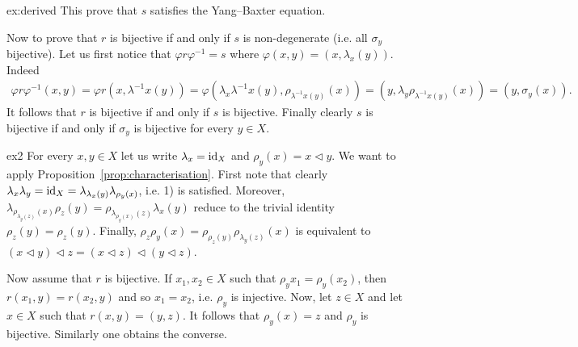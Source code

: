 \begin{sol}{ex:derived}
    This prove that $s$ satisfies the Yang--Baxter equation.

    Now to prove that $r$ is bijective if and only if $s$ is non-degenerate (i.e. all $\sigma_y$ bijective). Let us first notice that $\varphi r\varphi^{-1} = s$ where $\varphi(x,y)=(x,\lambda_x(y))$. Indeed
    \begin{align*}
        \varphi r \varphi^{-1}(x,y) = \varphi r (x, \lambda^{-1}x(y))
        =\varphi(\lambda_x\lambda^{-1}x(y), \rho_{\lambda^{-1}x(y)}(x))
        =(y, \lambda_y\rho_{\lambda^{-1}x(y)}(x)) = (y,\sigma_y(x)).
    \end{align*}
    It follows that $r$ is bijective if and only if $s$ is bijective. Finally clearly $s$ is bijective if and only if $\sigma_y$ is bijective for every $y\in X$. 
\end{sol}

\begin{sol}{ex2}
    For every $x,y \in X$ let us write $\lambda_x = \operatorname{id}_X$ and $\rho_y(x)=x \triangleleft y$.
    We want to apply Proposition~\ref{prop:characterisation}.
    First note that clearly $\lambda_x\lambda_y =\operatorname{id}_X = \lambda_{\lambda_x(y)}\lambda_{\rho_y(x)}$, i.e. 1) is satisfied. 
    Moreover,$\lambda_{\rho_{\lambda_y(z)}(x)}\rho_z(y)=\rho_{\lambda_{\rho_y(x)}(z)}\lambda_x(y)$ reduce to the trivial identity $\rho_z(y)=\rho_{z}(y)$.
    Finally,  $\rho_z\rho_y(x)=\rho_{\rho_z(y)}\rho_{\lambda_y(z)}(x)$ is equivalent to $(x\triangleleft y)\triangleleft z=(x\triangleleft z)\triangleleft(y\triangleleft z)$.

    Now assume that $r$ is bijective. If $x_1,x_2\in X$ such that $\rho_y{x_1}=\rho_y(x_2)$, then $r(x_1,y)=r(x_2,y)$ and so $x_1=x_2$, i.e. $\rho_y$ is injective. Now, let $z \in X$ and let $x\in X$ such that $r(x,y) =(y,z)$. It follows that $\rho_y(x)=z$ and $\rho_y$ is bijective. 
    Similarly one obtains the converse. 
\end{sol}

